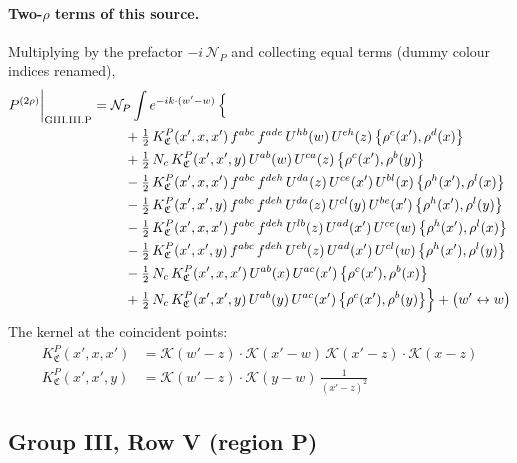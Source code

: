 \documentclass[10pt]{article}
\numberwithin{equation}{section}
\newcommand{\KK}{\mathcal K}
\newcommand{\NP}{\mathcal N_{P}}
\begin{document}
\paragraph{Two-$\rho$ terms of this source.} Multiplying by the prefactor $-i\,\NP$ and collecting equal terms (dummy colour indices renamed),
\begin{align}
P^{(2\rho)}\bigg|_{\rm GIII.III.P}={}&\NP\int e^{-ik\cdot(w'-w)}\,\Big\{\notag\\
&\quad +\tfrac12\,K^{P}_{\mathfrak C}(x',x,x')\,f^{abc}\,f^{ade}\,U^{hb}(w)\,U^{eh}(z)\,\big\{\rho^{c}(x'),\rho^{d}(x)\big\}\notag\\
&\quad +\tfrac12\,N_{c}\,K^{P}_{\mathfrak C}(x',x',y)\,U^{ab}(w)\,U^{ca}(z)\,\big\{\rho^{c}(x'),\rho^{b}(y)\big\}\notag\\
&\quad -\tfrac12\,K^{P}_{\mathfrak C}(x',x,x')\,f^{abc}\,f^{deh}\,U^{da}(z)\,U^{ce}(x')\,U^{bl}(x)\,\big\{\rho^{h}(x'),\rho^{l}(x)\big\}\notag\\
&\quad -\tfrac12\,K^{P}_{\mathfrak C}(x',x',y)\,f^{abc}\,f^{deh}\,U^{da}(z)\,U^{cl}(y)\,U^{be}(x')\,\big\{\rho^{h}(x'),\rho^{l}(y)\big\}\notag\\
&\quad -\tfrac12\,K^{P}_{\mathfrak C}(x',x,x')\,f^{abc}\,f^{deh}\,U^{lb}(z)\,U^{ad}(x')\,U^{ce}(w)\,\big\{\rho^{h}(x'),\rho^{l}(x)\big\}\notag\\
&\quad -\tfrac12\,K^{P}_{\mathfrak C}(x',x',y)\,f^{abc}\,f^{deh}\,U^{eb}(z)\,U^{ad}(x')\,U^{cl}(w)\,\big\{\rho^{h}(x'),\rho^{l}(y)\big\}\notag\\
&\quad -\tfrac12\,N_{c}\,K^{P}_{\mathfrak C}(x',x,x')\,U^{ab}(x)\,U^{ac}(x')\,\big\{\rho^{c}(x'),\rho^{b}(x)\big\}\notag\\
&\quad +\tfrac12\,N_{c}\,K^{P}_{\mathfrak C}(x',x',y)\,U^{ab}(y)\,U^{ac}(x')\,\big\{\rho^{c}(x'),\rho^{b}(y)\big\}\Big\}+\big(w'\leftrightarrow w\big)\label{eq:res-GIII.III.P}
\end{align}
The kernel at the coincident points:
\begin{align*}
K^{P}_{\mathfrak C}(x',x,x')&=\KK(w'-z)\cdot\KK(x'-w)\,\KK(x'-z)\cdot\KK(x-z)\\K^{P}_{\mathfrak C}(x',x',y)&=\KK(w'-z)\cdot\KK(y-w)\,\frac{1}{(x'-z)^2}
\end{align*}
\subsection{Group III, Row V (region P)}\label{sec:GIII.V.P}
\end{document}
